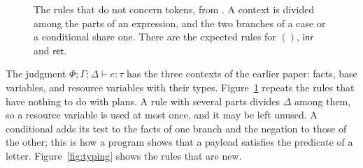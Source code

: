 \documentclass[acmsmall,nonacm,screen]{acmart}
\newcommand{\kw}[1]{\mathsf{#1}}
\newcommand{\Base}{\kw{Base}}
\newcommand{\model}{\kw{model}}
\newcommand{\letin}[3]{\kw{let}\;#1 = #2\;\kw{in}\;#3}
\newcommand{\ite}[3]{\kw{if}\;#1\;\kw{then}\;#2\;\kw{else}\;#3}
\newcommand{\inl}{\kw{inl}\,}
\newcommand{\inr}{\kw{inr}\,}
\begin{document}
\begin{figure}[t]
\caption{The rules that do not concern tokens, from \citet{tpp4}. A context is divided among
the parts of an expression, and the two branches of a case or a conditional share one. There
are the expected rules for $()$, $\inr$ and $\kw{ret}$.}
\label{fig:rest}
\end{figure}

The judgment $\Phi; \Gamma; \Delta \vdash e : \tau$ has the three contexts of the earlier
paper: facts, base variables, and resource variables with their types.
Figure~\ref{fig:rest} repeats the rules that have nothing to do with plans. A rule with
several parts divides $\Delta$ among them, so a resource variable is used at most once, and
it may be left unused. A conditional adds its test to the facts of one branch and the
negation to those of the other; this is how a program shows that a payload satisfies the
predicate of a letter. Figure~\ref{fig:typing} shows the rules that are new.
\end{document}
